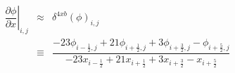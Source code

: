 \documentclass[gmd]{copernicus}
\begin{document}
\begin{eqnarray}
\nonumber
\left. \dfrac{\partial \phi}{\partial x}\right|_{i,j} & \approx & \delta^{4xb} \left( \phi \right)_{i,j}\\
& \equiv & \dfrac{-23 \phi_{i-\frac{1}{2},j} + 21 \phi_{i+\frac{1}{2},j} + 3 \phi_{i+\frac{3}{2},j} - \phi_{i+\frac{5}{2},j}}
                 {-23    x_{i-\frac{1}{2}}   + 21    x_{i+\frac{1}{2}}   + 3    x_{i+\frac{3}{2}}   -    x_{i+\frac{5}{2}}}
\end{eqnarray}


\end{document}
